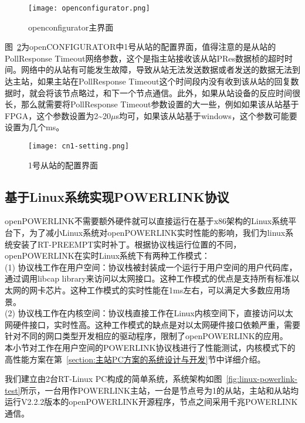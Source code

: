 \begin{figure}[!htb]
  \centering
  \texttt{[image: openconfigurator.png]}
  \caption{openconfigurator主界面}
  \label{fig:openconfigurator}
\end{figure}

图~\ref{fig:cn1-setting}为openCONFIGURATOR中1号从站的配置界面，值得注意的是从站的PollResponse Timeout网络参数，这个是指主站接收该从站PRes数据桢的超时时间。网络中的从站有可能发生故障，导致从站无法发送数据或者发送的数据无法到达主站，如果主站在PollResponse Timeout这个时间段内没有收到该从站的回复数据时，就会将该节点略过，和下一个节点通信。此外，如果从站设备的反应时间很长，那么就需要将PollResponse Timeout参数设置的大一些，例如如果该从站基于FPGA，这个参数设置为2\~{}20$\mu$s均可，如果该从站基于windows，这个参数可能要设置为几个ms。

\begin{figure}[!htb]
  \centering
  \texttt{[image: cn1-setting.png]}
  \caption{1号从站的配置界面}
  \label{fig:cn1-setting}
\end{figure}

\subsection{基于Linux系统实现POWERLINK协议}

openPOWERLINK不需要额外硬件就可以直接运行在基于x86架构的Linux系统平台下，为了减小Linux系统对openPOWERLINK实时性能的影响，我们为linux系统安装了RT-PREEMPT实时补丁。根据协议栈运行位置的不同，openPOWERLINK在实时Linux系统下有两种工作模式\cite{wallner}：\\
(1) 协议栈工作在用户空间：协议栈被封装成一个运行于用户空间的用户代码库，通过调用libcap library来访问以太网接口。这种工作模式的优点是支持所有标准以太网的网卡芯片。这种工作模式的实时性能在1ms左右，可以满足大多数应用场景。\\
(2) 协议栈工作在内核空间：协议栈直接工作在Linux内核空间下，直接访问以太网硬件接口，实时性高。这种工作模式的缺点是对以太网硬件接口依赖严重，需要针对不同的网口类型开发相应的驱动程序，限制了openPOWERLINK的应用。\\


本小节对工作在用户空间的POWERLINK协议栈进行了性能测试，内核模式下的高性能方案在第~\ref{section:主站PC方案的系统设计与开发}节中详细介绍。

我们建立由2台RT-Linux PC构成的简单系统，系统架构如图~\ref{fig:linux-powerlink-test}所示，一台用作POWERLINK主站，一台是节点号为1的从站，主站和从站均运行V2.2.2版本的openPOWERLINK开源程序，节点之间采用千兆POWERLINK通信。

